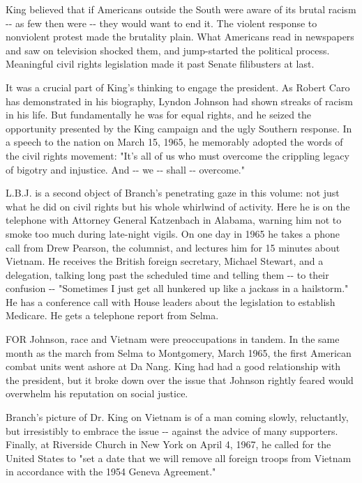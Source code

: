 King believed that if Americans outside the South were aware of its
brutal racism -\/- as few then were -\/- they would want to end it. The
violent response to nonviolent protest made the brutality plain. What
Americans read in newspapers and saw on television shocked them, and
jump-started the political process. Meaningful civil rights legislation
made it past Senate filibusters at last.

It was a crucial part of King's thinking to engage the president. As
Robert Caro has demonstrated in his biography, Lyndon Johnson had shown
streaks of racism in his life. But fundamentally he was for equal
rights, and he seized the opportunity presented by the King campaign and
the ugly Southern response. In a speech to the nation on March 15, 1965,
he memorably adopted the words of the civil rights movement: "It's all
of us who must overcome the crippling legacy of bigotry and injustice.
And -\/- we -\/- shall -\/- overcome."

L.B.J. is a second object of Branch's penetrating gaze in this volume:
not just what he did on civil rights but his whole whirlwind of
activity. Here he is on the telephone with Attorney General Katzenbach
in Alabama, warning him not to smoke too much during late-night vigils.
On one day in 1965 he takes a phone call from Drew Pearson, the
columnist, and lectures him for 15 minutes about Vietnam. He receives
the British foreign secretary, Michael Stewart, and a delegation,
talking long past the scheduled time and telling them -\/- to their
confusion -\/- "Sometimes I just get all hunkered up like a jackass in a
hailstorm." He has a conference call with House leaders about the
legislation to establish Medicare. He gets a telephone report from
Selma.

FOR Johnson, race and Vietnam were preoccupations in tandem. In the same
month as the march from Selma to Montgomery, March 1965, the first
American combat units went ashore at Da Nang. King had had a good
relationship with the president, but it broke down over the issue that
Johnson rightly feared would overwhelm his reputation on social justice.

Branch's picture of Dr. King on Vietnam is of a man coming slowly,
reluctantly, but irresistibly to embrace the issue -\/- against the
advice of many supporters. Finally, at Riverside Church in New York on
April 4, 1967, he called for the United States to "set a date that we
will remove all foreign troops from Vietnam in accordance with the 1954
Geneva Agreement."


